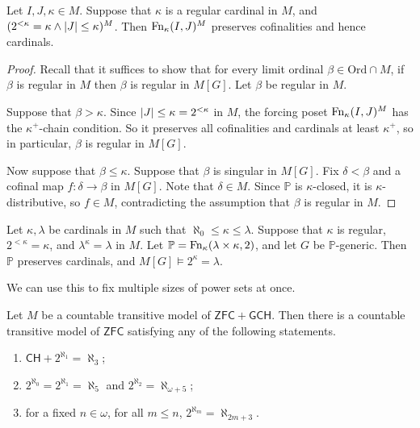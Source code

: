 \begin{theorem}
    Let \( I, J, \kappa \in M \).
    Suppose that \( \kappa \) is a regular cardinal in \( M \), and \( (2^{<\kappa} = \kappa \wedge \abs{J} \leq \kappa)^M \).
    Then \( \operatorname{Fn}_\kappa(I, J)^M \) preserves cofinalities and hence cardinals.
\end{theorem}
\begin{proof}
    Recall that it suffices to show that for every limit ordinal \( \beta \in \mathrm{Ord} \cap M \), if \( \beta \) is regular in \( M \) then \( \beta \) is regular in \( M[G] \).
    Let \( \beta \) be regular in \( M \).

    Suppose that \( \beta > \kappa \).
    Since \( \abs{J} \leq \kappa = 2^{<\kappa} \) in \( M \), the forcing poset \( \operatorname{Fn}_\kappa(I, J)^M \) has the \( \kappa^+ \)-chain condition.
    So it preserves all cofinalities and cardinals at least \( \kappa^+ \), so in particular, \( \beta \) is regular in \( M[G] \).

    Now suppose that \( \beta \leq \kappa \).
    Suppose that \( \beta \) is singular in \( M[G] \).
    Fix \( \delta < \beta \) and a cofinal map \( f : \delta \to \beta \) in \( M[G] \).
    Note that \( \delta \in M \).
    Since \( \mathbb P \) is \( \kappa \)-closed, it is \( \kappa \)-distributive, so \( f \in M \), contradicting the assumption that \( \beta \) is regular in \( M \).
\end{proof}
\begin{theorem}
    Let \( \kappa, \lambda \) be cardinals in \( M \) such that \( \aleph_0 \leq \kappa \leq \lambda \).
    Suppose that \( \kappa \) is regular, \( 2^{<\kappa} = \kappa \), and \( \lambda^\kappa = \lambda \) in \( M \).
    Let \( \mathbb P = \operatorname{Fn}_\kappa(\lambda \times \kappa, 2) \), and let \( G \) be \( \mathbb P \)-generic.
    Then \( \mathbb P \) preserves cardinals, and \( M[G] \vDash 2^\kappa = \lambda \).
\end{theorem}
We can use this to fix multiple sizes of power sets at once.
\begin{theorem}
    Let \( M \) be a countable transitive model of \( \mathsf{ZFC} + \mathsf{GCH} \).
    Then there is a countable transitive model of \( \mathsf{ZFC} \) satisfying any of the following statements.
    \begin{enumerate}
        \item \( \mathsf{CH} + 2^{\aleph_1} = \aleph_3 \);
        \item \( 2^{\aleph_0} = 2^{\aleph_1} = \aleph_5 \) and \( 2^{\aleph_2} = \aleph_{\omega + 5} \);
        \item for a fixed \( n \in \omega \), for all \( m \leq n \), \( 2^{\aleph_m} = \aleph_{2m + 3} \).
    \end{enumerate}
\end{theorem}
